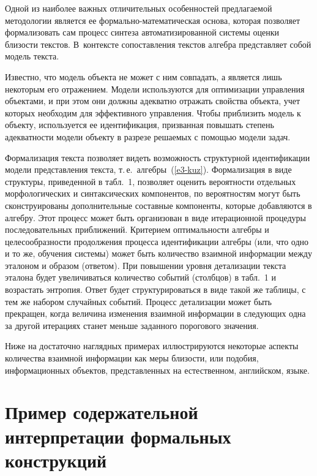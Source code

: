 \begin{multicols}{2}
      
      Одной из наиболее важных отличительных особенностей предлагаемой 
методологии является ее фор\-маль\-но-ма\-те\-ма\-ти\-че\-ская основа, которая 
позволяет формализовать сам процесс синтеза автоматизированной системы оценки 
близости текстов. В~контексте сопоставления текстов алгебра представляет собой 
модель текста. 
      
      Известно, что модель объекта не может с ним совпадать, а является лишь 
некоторым его отражением. Модели используются для оптимизации управления 
объектами, и при этом они должны адекватно отражать свойства объекта, учет 
которых необходим для эффективного управления. Чтобы приблизить модель к 
объекту, используется ее идентификация, призванная повышать степень 
адекватности модели объекту в разрезе решаемых с по\-мощью модели задач. 
      
      Формализация текста позволяет видеть возможность структурной 
идентификации модели представления текста, т.\,е.\ алгебры~(\ref{e3-kuz}). 
Формализация в виде структуры, приведенной в табл.~1, позволяет оценить 
вероятности отдельных морфологических и синтаксических компонентов, по 
вероятностям могут быть сконструированы дополнительные составные компоненты, 
которые добавляются в ал\-геб\-ру. Этот процесс может быть организован в виде 
итерационной процедуры последовательных приближений. Критерием 
оптимальности алгебры и целесообразности продолжения процесса идентификации 
алгебры (или, что одно и то же, обучения системы) может быть количество 
взаимной информации между эталоном и образом (ответом). При повышении 
уровня детализации текста эталона будет увеличиваться количество событий 
(столбцов) в табл.~1 и возрастать энтропия. Ответ будет структурироваться в виде 
такой же таблицы, с тем же набором случайных событий. Процесс детализации 
может быть прекращен, когда величина изменения взаимной информации в 
следующих одна за другой итерациях станет меньше заданного порогового 
значения. 
      
      \smallskip
      
      Ниже на достаточно наглядных примерах иллюстрируются некоторые 
аспекты количества взаимной информации как меры близости, или подобия, 
информационных объектов, представленных на естественном, английском, 
языке.
      

\section{Пример содержательной интерпретации формальных 
конструкций}
      

\end{multicols}
